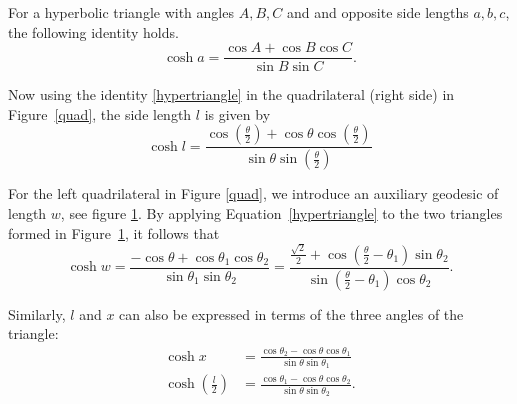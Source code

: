 \documentclass[11pt,reqno]{amsart}
\theoremstyle{plain}
\theoremstyle{definition}
\theoremstyle{remark}
\numberwithin{equation}{section}
\numberwithin{figure}{section}
\begin{document}
For a hyperbolic triangle with angles \(A,B,C\) and and opposite side lengths \(a,b,c\), the following identity holds.
\begin{equation}
\label{hypertriangle}
    \cosh a=\frac{\cos A +\cos B \cos C }{\sin B \sin C }.
\end{equation}

Now using the identity \eqref{hypertriangle} in the quadrilateral (right side) in Figure~\ref{quad}, the side length \(l\) is given by
\begin{equation}
    \label{triangle1}
    \cosh{l} = \frac{\cos\left(\frac{\theta}{2}\right)+\cos\theta \cos\left(\frac{\theta}{2}\right)}{\sin\theta\sin\left(\frac{\theta}{2}\right)}
\end{equation}

\begin{figure}[htbp]
    \centering
    \caption{}
    \label{quad2}
\end{figure}


For the left quadrilateral in Figure \ref{quad}, we introduce an auxiliary geodesic of length $w$, see figure \ref{quad2}. By applying Equation~\eqref{hypertriangle} to the two triangles formed in Figure~\ref{quad2}, it follows that
\begin{equation}
\label{triangle2}
    \cosh w =\frac{-\cos \theta +\cos \theta_1 \cos \theta_2 }{\sin \theta_1 \sin \theta_2 }=\frac{\frac{\sqrt{2}}{2}+\cos(\frac{\theta}{2}-\theta_1)\sin \theta_2 }{\sin(\frac{\theta}{2}-\theta_1)\cos \theta_2 }.
\end{equation}

Similarly, $l$ and $x$ can also be expressed in terms of the three angles of the triangle:
\begin{equation}
\label{triangle3}
\begin{aligned}
    \cosh x &=\frac{\cos \theta_2 -\cos \theta \cos \theta_1 }{\sin \theta \sin \theta_1}\\
    \cosh\left(\frac{l}{2} \right)&=\frac{\cos \theta_1 -\cos \theta \cos \theta_2}{\sin \theta \sin \theta_2 }.
\end{aligned}
\end{equation}
\end{document}
